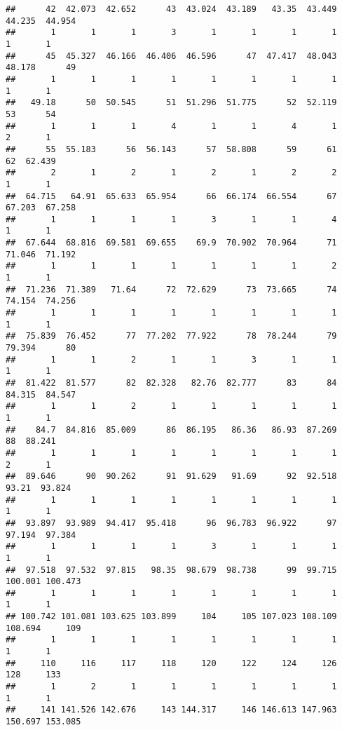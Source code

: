 \documentclass[]{article}
\begin{document}
\begin{verbatim}
##      42  42.073  42.652      43  43.024  43.189   43.35  43.449  44.235  44.954 
##       1       1       1       3       1       1       1       1       1       1 
##      45  45.327  46.166  46.406  46.596      47  47.417  48.043  48.178      49 
##       1       1       1       1       1       1       1       1       1       1 
##   49.18      50  50.545      51  51.296  51.775      52  52.119      53      54 
##       1       1       1       4       1       1       4       1       2       1 
##      55  55.183      56  56.143      57  58.808      59      61      62  62.439 
##       2       1       2       1       2       1       2       2       1       1 
##  64.715   64.91  65.633  65.954      66  66.174  66.554      67  67.203  67.258 
##       1       1       1       1       3       1       1       4       1       1 
##  67.644  68.816  69.581  69.655    69.9  70.902  70.964      71  71.046  71.192 
##       1       1       1       1       1       1       1       2       1       1 
##  71.236  71.389   71.64      72  72.629      73  73.665      74  74.154  74.256 
##       1       1       1       1       1       1       1       1       1       1 
##  75.839  76.452      77  77.202  77.922      78  78.244      79  79.394      80 
##       1       1       2       1       1       3       1       1       1       1 
##  81.422  81.577      82  82.328   82.76  82.777      83      84  84.315  84.547 
##       1       1       2       1       1       1       1       1       1       1 
##    84.7  84.816  85.009      86  86.195   86.36   86.93  87.269      88  88.241 
##       1       1       1       1       1       1       1       1       2       1 
##  89.646      90  90.262      91  91.629   91.69      92  92.518   93.21  93.824 
##       1       1       1       1       1       1       1       1       1       1 
##  93.897  93.989  94.417  95.418      96  96.783  96.922      97  97.194  97.384 
##       1       1       1       1       3       1       1       1       1       1 
##  97.518  97.532  97.815   98.35  98.679  98.738      99  99.715 100.001 100.473 
##       1       1       1       1       1       1       1       1       1       1 
## 100.742 101.081 103.625 103.899     104     105 107.023 108.109 108.694     109 
##       1       1       1       1       1       1       1       1       1       1 
##     110     116     117     118     120     122     124     126     128     133 
##       1       2       1       1       1       1       1       1       1       1 
##     141 141.526 142.676     143 144.317     146 146.613 147.963 150.697 153.085 

\end{verbatim}
\end{document}
